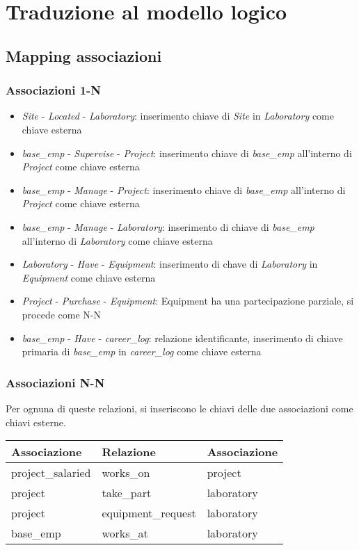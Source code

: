 \section{Traduzione al modello logico}
\subsection{Mapping associazioni}
\subsubsection{Associazioni 1-N}
\begin{itemize}
	\item \textit{Site} - \textit{Located} - \textit{Laboratory}:  inserimento chiave di \textit{Site} in \textit{Laboratory} come chiave esterna
	\item \textit{base\_emp} - \textit{Supervise} - \textit{Project}: inserimento chiave di \textit{base\_emp} all'interno di \textit{Project} come chiave esterna
	\item \textit{base\_emp} - \textit{Manage} - \textit{Project}: inserimento chiave di \textit{base\_emp} all'interno di \textit{Project} come chiave esterna
	\item \textit{base\_emp} - \textit{Manage} - \textit{Laboratory}: inserimento di chiave di \textit{base\_emp} all'interno di \textit{Laboratory} come chiave esterna
	\item \textit{Laboratory} - \textit{Have} - \textit{Equipment}: inserimento di chave di \textit{Laboratory} in \textit{Equipment} come chiave esterna
	\item \textit{Project} - \textit{Purchase} - \textit{Equipment}: Equipment ha una partecipazione parziale, si procede come N-N
	\item \textit{base\_emp} - \textit{Have} - \textit{career\_log}: relazione identificante, inserimento di chiave primaria di \textit{base\_emp} in \textit{career\_log} come chiave esterna
\end{itemize}
\subsubsection{Associazioni N-N}
Per ognuna di queste relazioni, si inseriscono le chiavi delle due associazioni come chiavi esterne.\meskip
\begin{tabular}{@{}| l | l | l |}
	\hline
	\textbf{Associazione} & \textbf{Relazione} & \textbf{Associazione} \\
	\hline
	project\_salaried     & works\_on          & project               \\
	\hline
	project               & take\_part         & laboratory            \\
	\hline
	project               & equipment\_request & laboratory            \\
	\hline
	base\_emp             & works\_at          & laboratory            \\
	\hline
\end{tabular}

